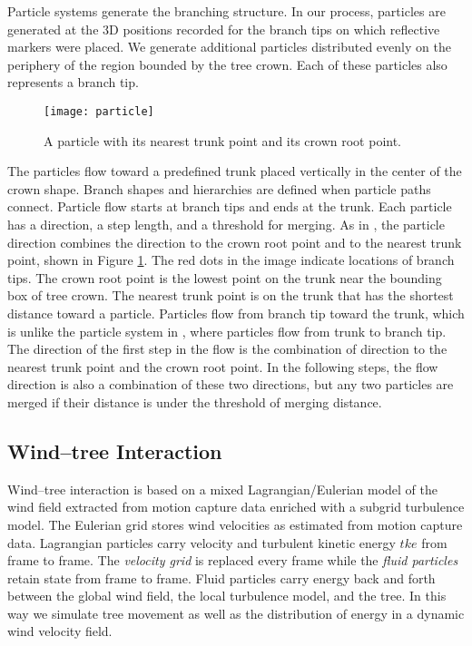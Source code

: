 Particle systems generate the branching structure.  In our process, particles are generated at the 3D positions recorded for the branch tips on which reflective markers were placed. We generate additional particles distributed evenly on the periphery of the region bounded by the tree crown. Each of these particles also represents a branch tip.

\begin{figure}[!t]
\centering
\texttt{[image: particle]}
\caption{A particle with its nearest trunk point and its crown root point.}
\label{fig:particle}
\end{figure}

The particles flow toward a predefined trunk placed vertically in the center of the crown shape. Branch shapes and hierarchies are defined when particle paths connect. Particle flow starts at branch tips and ends at the trunk. Each particle has a direction, a step length, and a threshold for merging. As in \cite{neubert:acmtg07}, the particle direction combines the direction to the crown root point and to the nearest trunk point, shown in Figure \ref{fig:particle}. The red dots in the image indicate locations of branch tips. The crown root point is the lowest point on the trunk near the bounding box of tree crown. The nearest trunk point is on the trunk that has the shortest distance toward a particle. Particles flow from branch tip toward the trunk, which is unlike the particle system in \cite{palubicki:siggraph09}, where particles flow from trunk to branch tip. The direction of the first step in the flow is the combination of direction to the nearest trunk point and the crown root point. In the following steps, the flow direction is also a combination of these two directions, but any two particles are merged if their distance is under the threshold of merging distance.

\subsection{Wind--tree Interaction}

Wind--tree interaction is based on a mixed Lagrangian/Eulerian model of the wind field extracted from motion capture data enriched with a subgrid turbulence model. The Eulerian grid stores wind velocities as estimated from motion capture data. Lagrangian particles carry velocity and turbulent kinetic energy $tke$ from frame to frame. The \textit{velocity grid} is replaced every frame while the \textit{fluid particles} retain state from frame to frame.
Fluid particles carry energy back and forth between the global wind field, the local turbulence model, and the tree. In this way we simulate tree movement as well as the distribution of energy in a dynamic wind velocity field.

